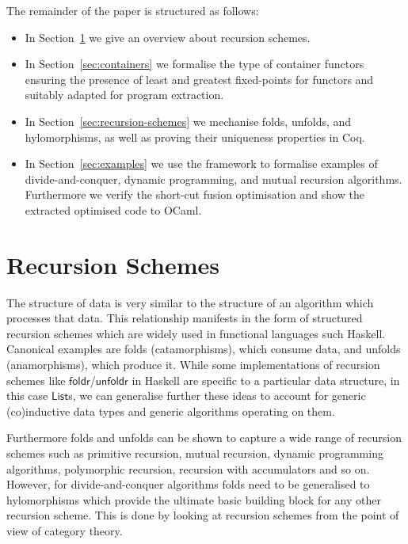 \documentclass[a4paper,anonymous, UKenglish,cleveref, autoref, thm-restate]{lipics-v2021}
\newcommand{\operator}[1]{\textsf{#1}}
\begin{document}
The remainder of the paper is structured as follows:
\begin{itemize}
  \item In Section~\ref{sec:category-theory} we give an overview about recursion
schemes.
  \item In Section~\ref{sec:containers} we formalise the type of container
functors ensuring the presence of least and greatest fixed-points for functors
and suitably adapted for program extraction.
  \item In Section~\ref{sec:recursion-schemes} we mechanise folds, unfolds, and
hylomorphisms, as well as proving their uniqueness properties in Coq.
  \item In Section~\ref{sec:examples} we use the framework to formalise examples
of divide-and-conquer, dynamic programming, and mutual recursion algorithms.
Furthermore we verify the short-cut fusion optimisation and show the extracted
optimised code to OCaml.
\end{itemize}

\section{Recursion Schemes}\label{sec:category-theory}
The structure of data is very similar to the structure of an algorithm which
processes that data. This relationship manifests in the form of structured
recursion schemes which are widely used in functional languages such Haskell.
Canonical examples are folds (catamorphisms), which consume data, and unfolds
(anamorphisms), which produce it. While some implementations of recursion
schemes like $\operator{foldr}$/$\operator{unfoldr}$ in Haskell are specific to
a particular data structure, in this case $\operator{List}$s, we can generalise
further these ideas to account for generic (co)inductive data types and generic
algorithms operating on them.

Furthermore folds and unfolds can be shown to capture a wide
range of recursion schemes such as primitive recursion, mutual recursion,
dynamic programming algorithms, polymorphic recursion, recursion with
accumulators and so on. However, for divide-and-conquer algorithms folds need to
be generalised to hylomorphisms which provide the ultimate basic building block
for any other recursion scheme. This is done by looking at recursion schemes
from the point of view of category theory.
\end{document}
